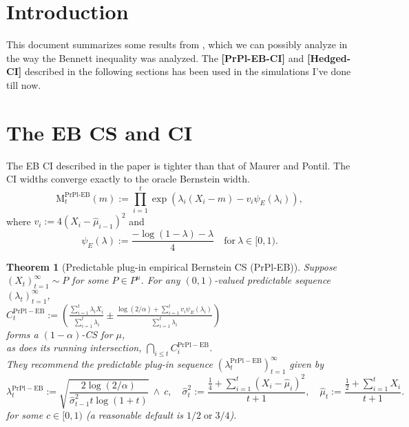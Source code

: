 \documentclass{article}
\renewcommand{\leq}{\leqslant}
\newtheorem{theorem}{Theorem}
\renewcommand{\thetheorem}{3}
\begin{document}
\section{Introduction}
This document summarizes some results from \cite{WauRam24a}, which we can possibly analyze in the way the Bennett inequality was analyzed. The \textbf{[PrPl-EB-CI]} and \textbf{[Hedged-CI]} described in the following sections has been used in the simulations I've done till now.
\section{The EB CS and CI}
The EB CI described in the paper is tighter than that of Maurer and Pontil. The CI widths converge exactly to the oracle Bernstein width. 
\setcounter{equation}{12}
\begin{equation} \label{eq:13}
    \text{M}^{\text{PrPl-EB}}_t (m) := \prod_{i=1}^{t} \exp\left( \lambda_i (X_i - m) - v_i \psi_E(\lambda_i) \right),
\end{equation}
where 
$
    v_i := 4 (X_i - \hat{\mu}_{i-1})^2
$
and
\begin{equation} \label{eq:14}
    \psi_E(\lambda) := \frac{-\log(1 - \lambda) - \lambda}{4} \quad \text{for} \ \lambda \in [0, 1).
\end{equation}
\renewcommand{\thetheorem}{2} 
\begin{theorem}[Predictable plug-in empirical Bernstein CS (PrPl-EB)] \label{thm:PrPl-EB}
Suppose \( (X_t)_{t=1}^{\infty} \sim P \) for some \( P \in P^{\mu} \). For any \( (0,1) \)-valued predictable sequence \( (\lambda_t)_{t=1}^{\infty} \),  \\

$ C_t^{\mathrm{PrPl-EB}} :=
   \left( \frac{\sum_{i=1}^{t} \lambda_i X_i}{\sum_{i=1}^{t} \lambda_i}
    \pm \frac{\log (2/\alpha) + \sum_{i=1}^{t} v_i \psi_E(\lambda_i)}{\sum_{i=1}^{t} \lambda_i} \right)$ \\
    
forms a \( (1 - \alpha) \)-CS for \( \mu \),  \\

as does its running intersection, \( \bigcap_{i \leq t} C_i^{\mathrm{PrPl-EB}} \).\\


They recommend the predictable plug-in sequence \( (\lambda_t^{\mathrm{PrPl-EB}})_{t=1}^{\infty} \) given by
\begin{equation} \label{eq:15}
    \lambda_t^{\mathrm{PrPl-EB}} := 
    \sqrt{\frac{2 \log(2/\alpha)}{\hat{\sigma}^2_{t-1} t \log(1 + t)}} \
    \wedge \ c,  \quad
    \hat{\sigma}^2_t := \frac{\frac{1}{4} + \sum_{i=1}^{t} (X_i - \hat{\mu}_i)^2}{t+1},  
    \quad \hat{\mu}_t := \frac{\frac{1}{2} + \sum_{i=1}^{t} X_i}{t+1}.
\end{equation}
for some \( c \in [0,1) \) (a reasonable default is \( 1/2 \;\text{or}\; 3/4 \)).
\end{theorem}
\end{document}
